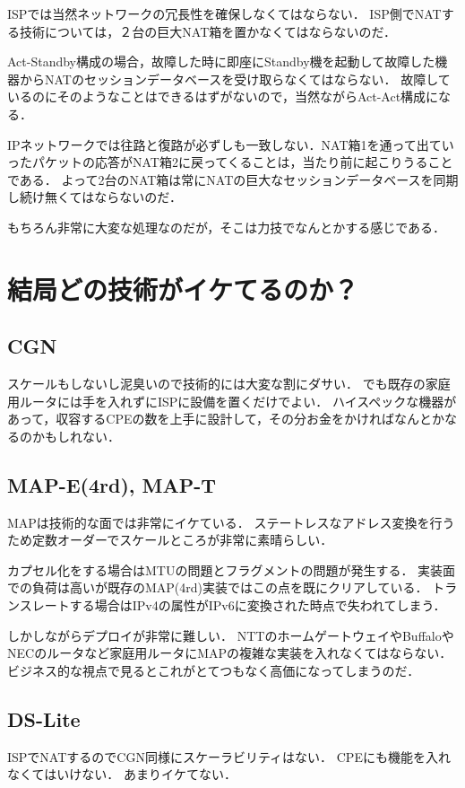 ISPでは当然ネットワークの冗長性を確保しなくてはならない．
ISP側でNATする技術については，２台の巨大NAT箱を置かなくてはならないのだ．

Act-Standby構成の場合，故障した時に即座にStandby機を起動して故障した機器からNATのセッションデータベースを受け取らなくてはならない．
故障しているのにそのようなことはできるはずがないので，当然ながらAct-Act構成になる．

IPネットワークでは往路と復路が必ずしも一致しない．NAT箱1を通って出ていったパケットの応答がNAT箱2に戻ってくることは，当たり前に起こりうることである．
よって2台のNAT箱は常にNATの巨大なセッションデータベースを同期し続け無くてはならないのだ．

もちろん非常に大変な処理なのだが，そこは力技でなんとかする感じである．

\section{結局どの技術がイケてるのか？}

\subsection{CGN}
スケールもしないし泥臭いので技術的には大変な割にダサい．
でも既存の家庭用ルータには手を入れずにISPに設備を置くだけでよい．
ハイスペックな機器があって，収容するCPEの数を上手に設計して，その分お金をかければなんとかなるのかもしれない．

\subsection{MAP-E(4rd), MAP-T}
MAPは技術的な面では非常にイケている．
ステートレスなアドレス変換を行うため定数オーダーでスケールところが非常に素晴らしい．

カプセル化をする場合はMTUの問題とフラグメントの問題が発生する．
実装面での負荷は高いが既存のMAP(4rd)実装ではこの点を既にクリアしている．
トランスレートする場合はIPv4の属性がIPv6に変換された時点で失われてしまう．

しかしながらデプロイが非常に難しい．
NTTのホームゲートウェイやBuffaloやNECのルータなど家庭用ルータにMAPの複雑な実装を入れなくてはならない．
ビジネス的な視点で見るとこれがとてつもなく高価になってしまうのだ．

\subsection{DS-Lite}
ISPでNATするのでCGN同様にスケーラビリティはない．
CPEにも機能を入れなくてはいけない．
あまりイケてない．

